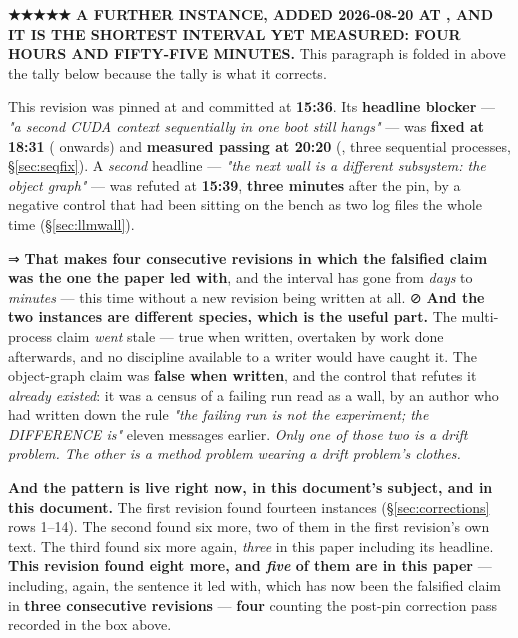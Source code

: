 \documentclass[10.5pt]{article}
\begin{document}
\begin{warnbox}\small
\textbf{★★★★★ A FURTHER INSTANCE, ADDED 2026-08-20 AT , AND IT IS THE SHORTEST
INTERVAL YET MEASURED: FOUR HOURS AND FIFTY-FIVE MINUTES.} This paragraph is folded in above the
tally below because the tally is what it corrects.

\smallskip
This revision was pinned at  and committed at \textbf{15:36}. Its
\textbf{headline blocker} --- \emph{"a second CUDA context sequentially in one boot still
hangs"} --- was \textbf{fixed at 18:31} ( onwards) and \textbf{measured passing
at 20:20} (, three sequential processes, \S\ref{sec:seqfix}). A \emph{second}
headline --- \emph{"the next wall is a different subsystem: the object graph"} --- was refuted at
\textbf{15:39}, \textbf{three minutes} after the pin, by a negative control that had been sitting
on the bench as two log files the whole time (\S\ref{sec:llmwall}).

\smallskip
⇒ \textbf{That makes four consecutive revisions in which the falsified claim was the one the
paper led with}, and the interval has gone from \emph{days} to \emph{minutes} --- this time
without a new revision being written at all. ⊘ \textbf{And the two
instances are different species, which is the useful part.} The multi-process claim
\emph{went} stale --- true when written, overtaken by work done afterwards, and no discipline
available to a writer would have caught it. The object-graph claim was \textbf{false when
written}, and the control that refutes it \emph{already existed}: it was a census of a failing
run read as a wall, by an author who had written down the rule \emph{"the failing run is not the
experiment; the DIFFERENCE is"} eleven messages earlier. \emph{Only one of those two is a drift
problem. The other is a method problem wearing a drift problem's clothes.}
\end{warnbox}

\textbf{And the pattern is live right now, in this document's subject, and in this document.}
The first revision found fourteen instances (\S\ref{sec:corrections} rows 1--14). The second
found six more, two of them in the first revision's own text. The third found six more again,
\emph{three} in this paper including its headline. \textbf{This revision found eight more, and
\emph{five} of them are in this paper} — including, again, the sentence it led with, which has
now been the falsified claim in \textbf{three consecutive revisions} — \textbf{four} counting
the post-pin correction pass recorded in the box above.
\end{document}
